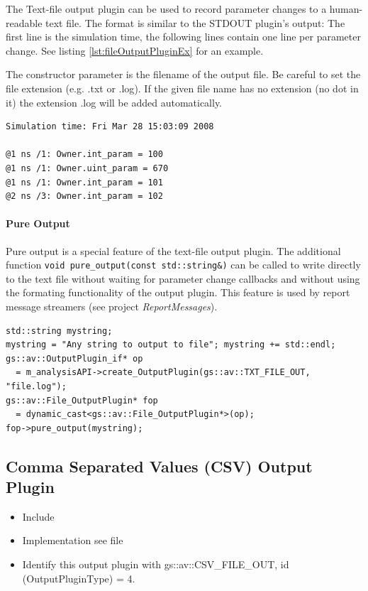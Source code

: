 The Text-file output plugin can be used to record parameter changes to a human-readable text file. The format is similar to the STDOUT plugin's output: The first line is the simulation time, the following lines contain one line per parameter change. See listing \ref{lst:fileOutputPluginEx} for an example.

The constructor parameter is the filename of the output file. Be careful to set the file extension (e.g. {\sffamily .txt} or {\sffamily .log}). If the given file name has no extension (no dot in it) the extension {\sffamily .log} will be added automatically.

\begin{lstlisting}[caption={Text-file output example}, label=lst:fileOutputPluginEx]
Simulation time: Fri Mar 28 15:03:09 2008

@1 ns /1: Owner.int_param = 100
@1 ns /1: Owner.uint_param = 670
@1 ns /1: Owner.int_param = 101
@2 ns /3: Owner.int_param = 102
\end{lstlisting}

\paragraph{Pure Output} Pure output is a special feature of the text-file output plugin. The additional function \lstinline[language=TeX]|void pure_output(const std::string&)| can be called to write directly to the text file without waiting for parameter change callbacks and without using the formating functionality of the output plugin. This feature is used by report message streamers (see project \textsl{ReportMessages}). %

\begin{lstlisting}[caption={Text-file \textsl{pure} output example}, label=lst:fileOutputPluginPureEx]
std::string mystring;
mystring = "Any string to output to file"; mystring += std::endl;
gs::av::OutputPlugin_if* op 
  = m_analysisAPI->create_OutputPlugin(gs::av::TXT_FILE_OUT, "file.log");
gs::av::File_OutputPlugin* fop 
  = dynamic_cast<gs::av::File_OutputPlugin*>(op);
fop->pure_output(mystring);
\end{lstlisting}


\subsection{Comma Separated Values (CSV) Output Plugin}
\label{GAVOPcsv}

\begin{itemize}
  \item Include 
  \item Implementation see file 
  \item Identify this output plugin with {\sffamily gs::av::CSV\_FILE\_OUT}, \newline
           id ({\sffamily OutputPluginType}) = 4.
\end{itemize}

